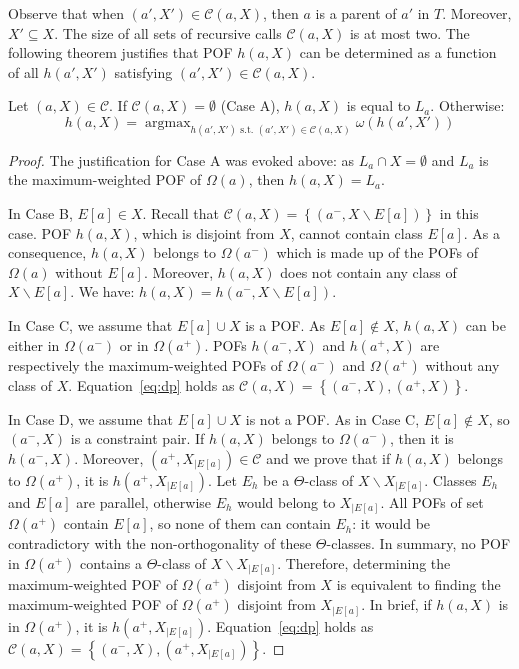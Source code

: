 \documentclass[a4paper,UKenglish,numberwithinsect,cleveref, autoref]{lipics-v2021}
\DeclareMathOperator*{\argmax}{argmax}
\newcommand{\set}[1]{\left\{ #1 \right\}}
\begin{document}
Observe that when $(a',X') \in \mathcal{C}(a,X)$, then $a$ is a parent of $a'$ in $T$. Moreover, $X' \subseteq X$. The size of all sets of recursive calls $\mathcal{C}(a,X)$ is at most two.
The following theorem justifies that POF $h(a,X)$ can be determined as a function of all $h(a',X')$ satisfying $(a',X') \in \mathcal{C}(a,X)$.

\begin{theorem}
Let $(a,X) \in \mathcal{C}$. If $\mathcal{C}(a,X) = \emptyset$ (Case A), $h(a,X)$ is equal to $L_a$. Otherwise:
\begin{equation}
h(a,X) = \argmax_{h(a',X') \mbox{~s.t.~} (a',X') \in \mathcal{C}(a,X)} \omega\left(h(a',X')\right)
\label{eq:dp}
\end{equation}
\label{th:dp_pairs}
\end{theorem}
\begin{proof}
The justification for Case A was evoked above: as $L_a \cap X = \emptyset$ and $L_a$ is the maximum-weighted POF of $\Omega(a)$, then $h(a,X) = L_a$.

In Case B, $E\left[a\right] \in X$. Recall that $\mathcal{C}(a,X) = \set{(a^-,X\backslash E\left[a\right])}$ in this case. POF $h(a,X)$, which is disjoint from $X$, cannot contain class $E\left[a\right]$. As a consequence, $h(a,X)$ belongs to $\Omega(a^-)$ which is made up of the POFs of $\Omega(a)$ without $E\left[a\right]$. Moreover, $h(a,X)$ does not contain any class of $X\backslash E\left[a\right]$. We have: $h(a,X) = h(a^-,X\backslash E\left[a\right])$.

In Case C, we assume that $E\left[a\right] \cup X$ is a POF. As $E\left[a\right] \notin X$, $h(a,X)$ can be either in $\Omega(a^-)$ or in $\Omega(a^+)$. POFs $h(a^-,X)$ and $h(a^+,X)$ are respectively the maximum-weighted POFs of $\Omega(a^-)$ and $\Omega(a^+)$ without any class of $X$. Equation~\eqref{eq:dp} holds as $\mathcal{C}(a,X) = \set{(a^-,X),(a^+,X)}$.

In Case D, we assume that $E\left[a\right] \cup X$ is not a POF. As in Case C, $E\left[a\right] \notin X$, so $(a^-,X)$ is a constraint pair. If $h(a,X)$ belongs to $\Omega(a^-)$, then it is $h(a^-,X)$. Moreover, $(a^+,X_{|E[a]})\in \mathcal{C}$ and we prove that if $h(a,X)$ belongs to $\Omega(a^+)$, it is $h(a^+,X_{|E[a]})$. Let $E_h$ be a $\Theta$-class of $X\backslash X_{|E[a]}$. Classes $E_h$ and $E\left[a\right]$ are parallel, otherwise $E_h$ would belong to $X_{|E[a]}$. All POFs of set $\Omega(a^+)$ contain $E\left[a\right]$, so none of them can contain $E_h$: it would be contradictory with the non-orthogonality of these $\Theta$-classes. In summary, no POF in $\Omega(a^+)$ contains a $\Theta$-class of $X\backslash X_{|E[a]}$. Therefore, determining the maximum-weighted POF of $\Omega(a^+)$ disjoint from $X$ is equivalent to finding the maximum-weighted POF  of $\Omega(a^+)$ disjoint from $X_{|E[a]}$. In brief, if $h(a,X)$ is in $\Omega(a^+)$, it is $h(a^+,X_{|E[a]})$. Equation~\eqref{eq:dp} holds as $\mathcal{C}(a,X) = \set{(a^-,X),(a^+,X_{|E[a]})}$.
\end{proof}
\end{document}
